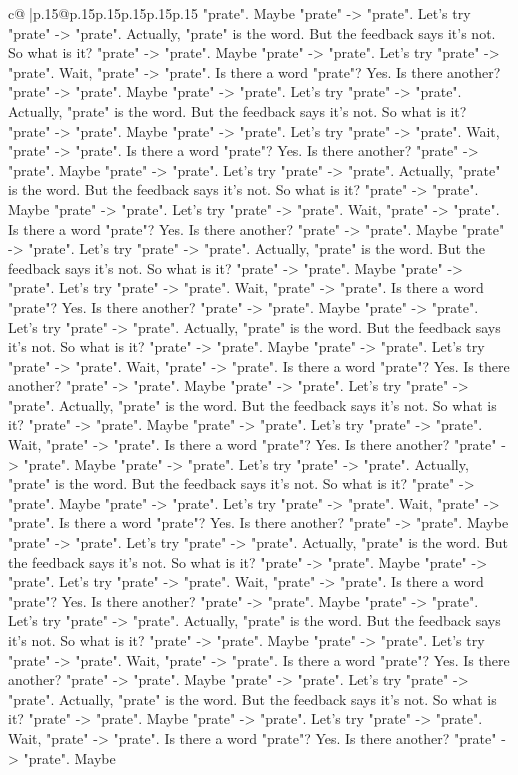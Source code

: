 \documentclass{article}
\begin{document}
{\begin{supertabular}{c@{$\;$}|p{.15\linewidth}@{}p{.15\linewidth}p{.15\linewidth}p{.15\linewidth}p{.15\linewidth}p{.15\linewidth}}
{{{"prate". Maybe "prate" {-}> "prate". Let's try "prate" {-}> "prate". Actually, "prate" is the word. But the feedback says it's not. So what is it? "prate" {-}> "prate". Maybe "prate" {-}> "prate". Let's try "prate" {-}> "prate". Wait, "prate" {-}> "prate". Is there a word "prate"? Yes. Is there another? "prate" {-}> "prate". Maybe "prate" {-}> "prate". Let's try "prate" {-}> "prate". Actually, "prate" is the word. But the feedback says it's not. So what is it? "prate" {-}> "prate". Maybe "prate" {-}> "prate". Let's try "prate" {-}> "prate". Wait, "prate" {-}> "prate". Is there a word "prate"? Yes. Is there another? "prate" {-}> "prate". Maybe "prate" {-}> "prate". Let's try "prate" {-}> "prate". Actually, "prate" is the word. But the feedback says it's not. So what is it? "prate" {-}> "prate". Maybe "prate" {-}> "prate". Let's try "prate" {-}> "prate". Wait, "prate" {-}> "prate". Is there a word "prate"? Yes. Is there another? "prate" {-}> "prate". Maybe "prate" {-}> "prate". Let's try "prate" {-}> "prate". Actually, "prate" is the word. But the feedback says it's not. So what is it? "prate" {-}> "prate". Maybe "prate" {-}> "prate". Let's try "prate" {-}> "prate". Wait, "prate" {-}> "prate". Is there a word "prate"? Yes. Is there another? "prate" {-}> "prate". Maybe "prate" {-}> "prate". Let's try "prate" {-}> "prate". Actually, "prate" is the word. But the feedback says it's not. So what is it? "prate" {-}> "prate". Maybe "prate" {-}> "prate". Let's try "prate" {-}> "prate". Wait, "prate" {-}> "prate". Is there a word "prate"? Yes. Is there another? "prate" {-}> "prate". Maybe "prate" {-}> "prate". Let's try "prate" {-}> "prate". Actually, "prate" is the word. But the feedback says it's not. So what is it? "prate" {-}> "prate". Maybe "prate" {-}> "prate". Let's try "prate" {-}> "prate". Wait, "prate" {-}> "prate". Is there a word "prate"? Yes. Is there another? "prate" {-}> "prate". Maybe "prate" {-}> "prate". Let's try "prate" {-}> "prate". Actually, "prate" is the word. But the feedback says it's not. So what is it? "prate" {-}> "prate". Maybe "prate" {-}> "prate". Let's try "prate" {-}> "prate". Wait, "prate" {-}> "prate". Is there a word "prate"? Yes. Is there another? "prate" {-}> "prate". Maybe "prate" {-}> "prate". Let's try "prate" {-}> "prate". Actually, "prate" is the word. But the feedback says it's not. So what is it? "prate" {-}> "prate". Maybe "prate" {-}> "prate". Let's try "prate" {-}> "prate". Wait, "prate" {-}> "prate". Is there a word "prate"? Yes. Is there another? "prate" {-}> "prate". Maybe "prate" {-}> "prate". Let's try "prate" {-}> "prate". Actually, "prate" is the word. But the feedback says it's not. So what is it? "prate" {-}> "prate". Maybe "prate" {-}> "prate". Let's try "prate" {-}> "prate". Wait, "prate" {-}> "prate". Is there a word "prate"? Yes. Is there another? "prate" {-}> "prate". Maybe "prate" {-}> "prate". Let's try "prate" {-}> "prate". Actually, "prate" is the word. But the feedback says it's not. So what is it? "prate" {-}> "prate". Maybe "prate" {-}> "prate". Let's try "prate" {-}> "prate". Wait, "prate" {-}> "prate". Is there a word "prate"? Yes. Is there another? "prate" {-}> "prate". Maybe }}}
\end{supertabular}}
\end{document}
